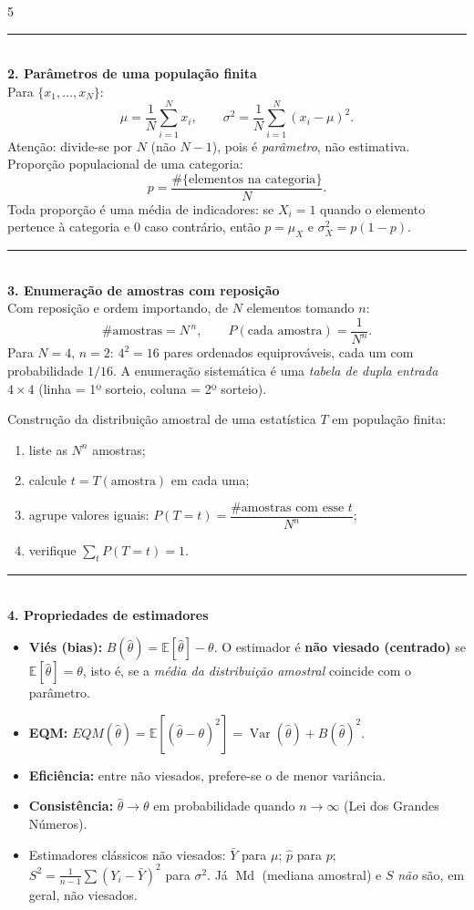 \documentclass[a4paper,8pt]{extarticle}
\newcommand{\tit}[1]{\vspace{2pt}\textcolor{azul}{\rule{\linewidth}{0.6pt}}\\[1pt]\textbf{\textcolor{azul}{#1}}\\[1pt]}
\newcommand{\E}{\mathbb{E}}
\newcommand{\Var}{\operatorname{Var}}
\newcommand{\Med}{\operatorname{Md}}
\begin{document}
\begin{multicols*}{5}
\tit{2. Parâmetros de uma população finita}
Para $\{x_1,\dots,x_N\}$:
\[\mu=\frac1N\sum_{i=1}^N x_i,\qquad \sigma^2=\frac1N\sum_{i=1}^N (x_i-\mu)^2 .\]
Atenção: divide-se por $N$ (não $N-1$), pois é \emph{parâmetro}, não estimativa. Proporção populacional de uma categoria:
\[p=\frac{\#\{\text{elementos na categoria}\}}{N}.\]
Toda proporção é uma média de indicadores: se $X_i=1$ quando o elemento pertence à categoria e $0$ caso contrário, então $p=\mu_X$ e $\sigma_X^2=p(1-p)$.

\tit{3. Enumeração de amostras com reposição}
Com reposição e ordem importando, de $N$ elementos tomando $n$:
\[\#\text{amostras}=N^{\,n},\qquad P(\text{cada amostra})=\frac{1}{N^{n}} .\]
Para $N=4$, $n=2$: $4^2=16$ pares ordenados equiprováveis, cada um com probabilidade $1/16$. A enumeração sistemática é uma \emph{tabela de dupla entrada} $4\times4$ (linha = 1º sorteio, coluna = 2º sorteio).

Construção da distribuição amostral de uma estatística $T$ em população finita:
\begin{enumerate}
\item liste as $N^n$ amostras;
\item calcule $t=T(\text{amostra})$ em cada uma;
\item agrupe valores iguais: $P(T=t)=\dfrac{\#\text{amostras com esse }t}{N^{n}}$;
\item verifique $\sum_t P(T=t)=1$.
\end{enumerate}

\tit{4. Propriedades de estimadores}
\begin{itemize}
\item \textbf{Viés (bias):} $B(\hat\theta)=\E[\hat\theta]-\theta$. O estimador é \textbf{não viesado (centrado)} se $\E[\hat\theta]=\theta$, isto é, se a \emph{média da distribuição amostral} coincide com o parâmetro.
\item \textbf{EQM:} $EQM(\hat\theta)=\E[(\hat\theta-\theta)^2]=\Var(\hat\theta)+B(\hat\theta)^2$.
\item \textbf{Eficiência:} entre não viesados, prefere-se o de menor variância.
\item \textbf{Consistência:} $\hat\theta\to\theta$ em probabilidade quando $n\to\infty$ (Lei dos Grandes Números).
\item Estimadores clássicos não viesados: $\bar Y$ para $\mu$; $\hat p$ para $p$; $S^2=\frac{1}{n-1}\sum(Y_i-\bar Y)^2$ para $\sigma^2$. Já $\Med$ (mediana amostral) e $S$ \emph{não} são, em geral, não viesados.
\end{itemize}


\end{multicols*}
\end{document}
